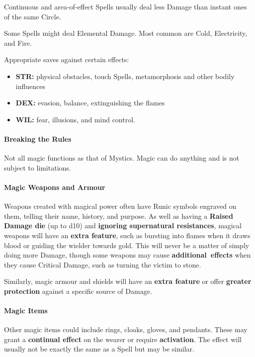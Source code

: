 \documentclass[itdr]{subfiles}
\begin{document}
Continuous and area-of-effect Spells usually deal less Damage than instant ones of the same Circle.

Some Spells might deal Elemental Damage. Most common are Cold, Electricity, and Fire.

Appropriate saves against certain effects:
\begin{itemize}
	\item \textbf{STR:} physical obstacles, touch Spells, metamorphosis and other bodily influences
	\item \textbf{DEX:} evasion, balance, extinguishing the flames
	\item \textbf{WIL:} fear, illusions, and mind control.
\end{itemize}

\vfill

\paragraph{Breaking the Rules}
Not all magic functions as that of Mystics. Magic can do anything and is not subject to limitations.

\vfill
\break

\paragraph{Magic Weapons and Armour}
Weapons created with magical power often have Runic symbols engraved on them, telling their name, history, and purpose. As well as having a \textbf{Raised Damage die} (up to d10) and \textbf{ignoring supernatural resistances}, magical weapons will have an \textbf{extra feature}, such as bursting into flames when it draws blood or guiding the wielder towards gold. This will never be a matter of simply \mbox{doing} more Damage, though some weapons may cause \mbox{\textbf{additional effects}} when they cause Critical Damage, such as turning the victim to stone.

Similarly, magic armour and shields will have an \textbf{extra feature} or offer \textbf{greater protection} against a specific source of Damage.

\vfill

\paragraph{Magic Items}
Other magic items could include rings, cloaks, gloves, and pendants. These may grant a \textbf{continual effect} on the wearer or require \textbf{activation}. The effect will usually not be exactly the same as a Spell but may be similar.
\end{document}
